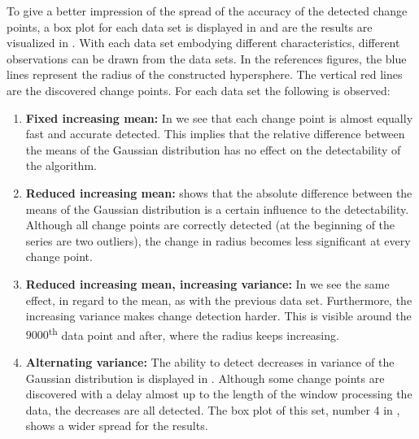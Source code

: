 To give a better impression of the spread of the accuracy of the detected change points, a box plot for each data set is displayed in  and are the results are visualized in .
With each data set embodying different characteristics, different observations can be drawn from the data sets.
In the references figures, the blue lines represent the radius of the constructed hypersphere.
The vertical red lines are the discovered change points.
For each data set the following is observed:
\begin{enumerate}
  \item \textbf{Fixed increasing mean:} In  we see that each change point is almost equally fast and accurate detected.
  This implies that the relative difference between the means of the Gaussian distribution has no effect on the detectability of the algorithm.
  \item \textbf{Reduced increasing mean:}  shows that the absolute difference between the means of the Gaussian distribution is a certain influence to the detectability.
  Although all change points are correctly detected (at the beginning of the series are two outliers), the change in radius becomes less significant at every change point.
  \item \textbf{Reduced increasing mean, increasing variance:} In  we see the same effect, in regard to the mean, as with the previous data set.
  Furthermore, the increasing variance makes change detection harder.
  This is visible around the $9000$\textsuperscript{th} data point and after, where the radius keeps increasing.
  \item \textbf{Alternating variance:} The ability to detect decreases in variance of the Gaussian distribution is displayed in .
  Although some change points are discovered with a delay almost up to the length of the window processing the data, the decreases are all detected.
  The box plot of this set, number 4 in , shows a wider spread for the results.
\end{enumerate}

